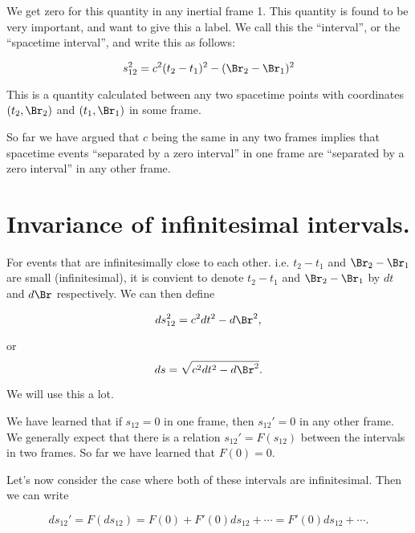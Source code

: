 We get zero for this quantity in any inertial frame 1.  This quantity is found to be very important, and want to give this a label.  We call this the ``interval'', or the ``spacetime interval'', and write this as follows:

\begin{equation}\label{eqn:relativisticElectrodynamicsL1:50}
s_{12}^2 = c^2 (t_2 - t_1)^2 - (\Br_2 - \Br_1)^2
\end{equation}

This is a quantity calculated between any two spacetime points with coordinates $(t_2, \Br_2)$ and $(t_1, \Br_1)$ in some frame.

So far we have argued that $c$ being the same in any two frames implies that spacetime events ``separated by a zero interval'' in one frame are ``separated by a zero interval'' in any other frame.

\section{Invariance of infinitesimal intervals.}

For events that are infinitesimally close to each other.  i.e. $t_2 - t_1$ and $\Br_2 -\Br_1$ are small (infinitesimal), it is convient to denote $t_2 - t_1$ and $\Br_2 - \Br_1$ by $dt$ and $d\Br$ respectively.  We can then define

\begin{equation}\label{eqn:relativisticElectrodynamicsL1:60}
ds_{12}^2 = c^2 dt^2 - d\Br^2,
\end{equation}

or
\begin{equation}\label{eqn:relativisticElectrodynamicsL1:60b}
ds= \sqrt{c^2 dt^2 - d\Br^2}.
\end{equation}

We will use this a lot.

We have learned that if $s_{12} = 0$ in one frame, then $s_{12}' = 0$ in any other frame.  We generally expect that there is a relation $s_{12}' = F(s_12)$ between the intervals in two frames.  So far we have learned that $F(0) = 0$. 

Let's now consider the case where both of these intervals are infinitesimal.  Then we can write

\begin{equation}\label{eqn:relativisticElectrodynamicsL1:70}
ds_{12}' = F(ds_{12}) = F(0) + F'(0) ds_{12} + \cdots = F'(0) ds_{12} + \cdots.
\end{equation}

